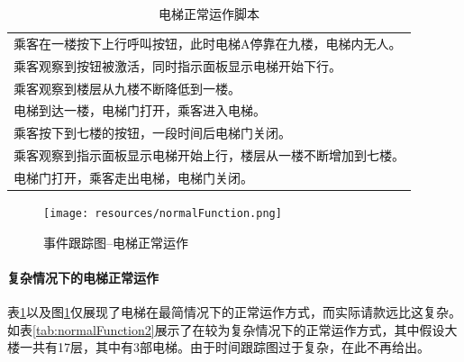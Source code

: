 \begin{table}[H]
	\centering
	\caption{电梯正常运作脚本}
	\label{tab:normalFunction}
	\begin{tabular}{l}
		\toprule
		乘客在一楼按下上行呼叫按钮，此时电梯A停靠在九楼，电梯内无人。\\ \cmidrule(lr){1-1}
		乘客观察到按钮被激活，同时指示面板显示电梯开始下行。\\ \cmidrule(lr){1-1}
		乘客观察到楼层从九楼不断降低到一楼。\\ \cmidrule(lr){1-1}
		电梯到达一楼，电梯门打开，乘客进入电梯。\\ \cmidrule(lr){1-1}
		乘客按下到七楼的按钮，一段时间后电梯门关闭。\\ \cmidrule(lr){1-1}
		乘客观察到指示面板显示电梯开始上行，楼层从一楼不断增加到七楼。\\ \cmidrule(lr){1-1}
		电梯门打开，乘客走出电梯，电梯门关闭。\\
		\bottomrule
	\end{tabular}
\end{table}

\begin{figure}[H]
	\centering
	\texttt{[image: resources/normalFunction.png]}
	\caption{事件跟踪图--电梯正常运作}
	\label{fig:normalFunction}
\end{figure}

\paragraph{复杂情况下的电梯正常运作}
表\ref{tab:normalFunction}以及图\ref{fig:normalFunction}仅展现了电梯在最简情况下的正常运作方式，而实际请款远比这复杂。如表\ref{tab:normalFunction2}展示了在较为复杂情况下的正常运作方式，其中假设大楼一共有17层，其中有3部电梯。由于时间跟踪图过于复杂，在此不再给出。


